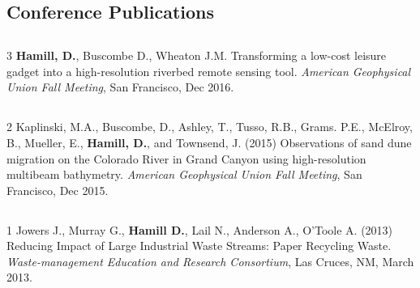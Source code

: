 \documentclass[margin,line]{resume}
\begin{document}
\begin{resume}
    \section{\mysidestyle Conference Publications}

    \begin{footnotesize}
    	
    \subsection{} 
    
	    \item[3] {\bf Hamill, D.}, Buscombe D., Wheaton J.M. Transforming a low-cost leisure gadget into a high-resolution riverbed remote sensing tool. {\sl American Geophysical Union Fall Meeting}, San Francisco, Dec 2016.\\
        
	\subsection{}
	\begin{list1}	
        
        \item[2] Kaplinski, M.A., Buscombe, D., Ashley, T., Tusso, R.B., Grams. P.E., McElroy, B., Mueller, E., {\bf Hamill, D.}, and Townsend, J. (2015) Observations of sand dune migration on the Colorado River in Grand Canyon using high-resolution multibeam bathymetry. {\sl American Geophysical Union Fall Meeting}, San Francisco, Dec 2015.\\
        
	\end{list1}
	
	\subsection{}
	\begin{list1}
		
	\item[1] Jowers J., Murray G., {\bf Hamill D.}, Lail N., Anderson A., O'Toole A. (2013) Reducing Impact of Large Industrial Waste Streams: Paper Recycling Waste. {\sl Waste-management Education and Research Consortium}, Las Cruces, NM, March 2013.\\
	
	\end{list1}
	
	        \end{footnotesize}


\end{resume}
\end{document}
